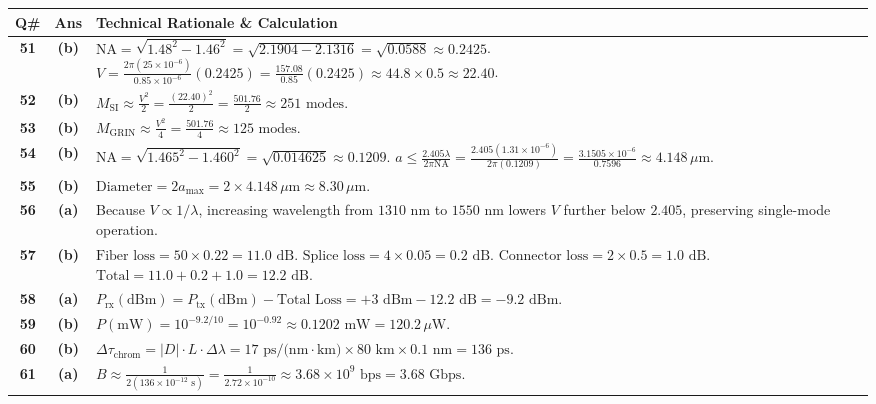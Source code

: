 {\small
\noindent\begin{tabularx}{\textwidth}{|c|c|X|}
\hline
\textbf{Q\#} & \textbf{Ans} & \textbf{Technical Rationale \& Calculation} \\
\hline
\textbf{51} & \textbf{(b)} & $\text{NA} = \sqrt{1.48^2 - 1.46^2} = \sqrt{2.1904 - 2.1316} = \sqrt{0.0588} \approx 0.2425$. $V = \frac{2\pi (25 \times 10^{-6})}{0.85 \times 10^{-6}}(0.2425) = \frac{157.08}{0.85}(0.2425) \approx 44.8 \times 0.5 \approx 22.40$. \\ \hline
\textbf{52} & \textbf{(b)} & $M_{\text{SI}} \approx \frac{V^2}{2} = \frac{(22.40)^2}{2} = \frac{501.76}{2} \approx 251\text{ modes}$. \\ \hline
\textbf{53} & \textbf{(b)} & $M_{\text{GRIN}} \approx \frac{V^2}{4} = \frac{501.76}{4} \approx 125\text{ modes}$. \\ \hline
\textbf{54} & \textbf{(b)} & $\text{NA} = \sqrt{1.465^2 - 1.460^2} = \sqrt{0.014625} \approx 0.1209$. $a \le \frac{2.405 \lambda}{2\pi \text{NA}} = \frac{2.405(1.31 \times 10^{-6})}{2\pi (0.1209)} = \frac{3.1505 \times 10^{-6}}{0.7596} \approx 4.148\,\mu\text{m}$. \\ \hline
\textbf{55} & \textbf{(b)} & $\text{Diameter} = 2a_{\text{max}} = 2 \times 4.148\,\mu\text{m} \approx 8.30\,\mu\text{m}$. \\ \hline
\textbf{56} & \textbf{(a)} & Because $V \propto 1/\lambda$, increasing wavelength from $1310\text{ nm}$ to $1550\text{ nm}$ lowers $V$ further below $2.405$, preserving single-mode operation. \\ \hline
\textbf{57} & \textbf{(b)} & $\text{Fiber loss} = 50 \times 0.22 = 11.0\text{ dB}$. $\text{Splice loss} = 4 \times 0.05 = 0.2\text{ dB}$. $\text{Connector loss} = 2 \times 0.5 = 1.0\text{ dB}$. $\text{Total} = 11.0 + 0.2 + 1.0 = 12.2\text{ dB}$. \\ \hline
\textbf{58} & \textbf{(a)} & $P_{\text{rx}}(\text{dBm}) = P_{\text{tx}}(\text{dBm}) - \text{Total Loss} = +3\text{ dBm} - 12.2\text{ dB} = -9.2\text{ dBm}$. \\ \hline
\textbf{59} & \textbf{(b)} & $P(\text{mW}) = 10^{-9.2/10} = 10^{-0.92} \approx 0.1202\text{ mW} = 120.2\,\mu\text{W}$. \\ \hline
\textbf{60} & \textbf{(b)} & $\Delta\tau_{\text{chrom}} = |D| \cdot L \cdot \Delta\lambda = 17\text{ ps/(nm}\cdot\text{km)} \times 80\text{ km} \times 0.1\text{ nm} = 136\text{ ps}$. \\ \hline
\textbf{61} & \textbf{(a)} & $B \approx \frac{1}{2(136 \times 10^{-12}\text{ s})} = \frac{1}{2.72 \times 10^{-10}} \approx 3.68 \times 10^9\text{ bps} = 3.68\text{ Gbps}$. \\ \hline

\end{tabularx}}
